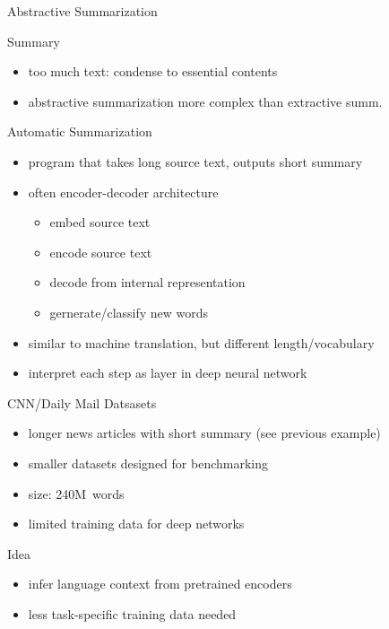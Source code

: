 \documentclass[english,handout]{mlutalk}
\newcommand{\CnnDailyMail}{\mbox{CNN}/Daily Mail\xspace}
\begin{document}
\begin{frame}{Abstractive Summarization}
\begin{block}{Summary}
    \end{block}
    \begin{itemize}
        \item too much text: condense to essential contents~\cite{Torres-Moreno2014}
        \item abstractive summarization more complex than extractive summ.
    \end{itemize}
\end{frame}

\begin{frame}{Automatic Summarization}
    \begin{itemize}
        \item program that takes long source text, outputs short summary
        \item often encoder-decoder architecture
        \begin{itemize}
            \item embed source text
            \item encode source text
            \item decode from internal representation
            \item gernerate/classify new words
        \end{itemize}
        \item similar to machine translation, but different length/vocabulary
        \item interpret each step as layer in deep neural network
    \end{itemize}
\end{frame}

\begin{frame}{\CnnDailyMail Datsasets~\cite{HermannKGEKSB2015}}
    \begin{itemize}
        \item longer news articles with short summary (see previous example)
        \item smaller datasets designed for benchmarking
        \item size: 240M~words
        \item limited training data for deep networks
    \end{itemize}
    \begin{block}{Idea}
        \begin{itemize}
            \item infer language context from pretrained encoders
            \item less task-specific training data needed
        \end{itemize}
    \end{block}
\end{frame}
\end{document}
